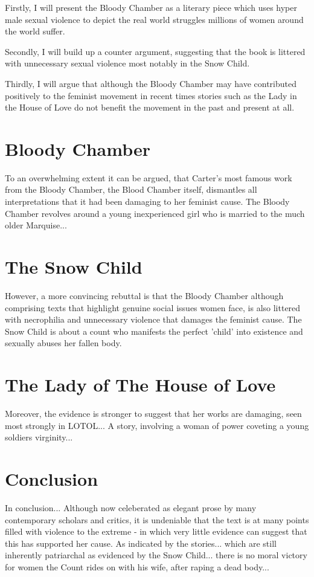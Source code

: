 \documentclass{article}
\begin{document}
Firstly, I will present the Bloody Chamber as a literary piece which uses hyper male sexual violence to depict
the real world struggles millions of women around the world suffer.

Secondly, I will build up a counter argument, suggesting that the book is littered with unnecessary sexual violence
most notably in the Snow Child.

Thirdly, I will argue that although the Bloody Chamber may have contributed positively to the feminist movement in recent
times stories such as the Lady in the House of Love do not benefit the movement in the past and present at all.

\section{Bloody Chamber}
To an overwhelming extent it can be argued, that Carter's most famous work from the Bloody Chamber, the Blood Chamber itself, dismantles all interpretations that it had been damaging to her feminist cause. The Bloody Chamber revolves around a young inexperienced girl who is married to the much older Marquise...
\section{The Snow Child}
However, a more convincing rebuttal is that the Bloody Chamber although comprising texts that highlight genuine social issues women face, is also littered with necrophilia and unnecessary violence that damages the feminist cause. The Snow Child is about a count who manifests the perfect 'child' into existence and sexually abuses her fallen body.

\section{The Lady of The House of Love}
Moreover, the evidence is stronger to suggest that her works are damaging, seen most strongly
in LOTOL... A story, involving a woman of power coveting a young soldiers virginity...

\section{Conclusion}
In conclusion... Although now celeberated as elegant prose by many contemporary scholars and critics,
it is undeniable that the text is at many points filled with violence to the extreme - in which very little evidence can suggest that this has supported her cause. As indicated by the stories... which are still inherently patriarchal as evidenced by the Snow Child... there is no moral victory for women the Count rides on with his wife, after raping a dead body...
\end{document}

